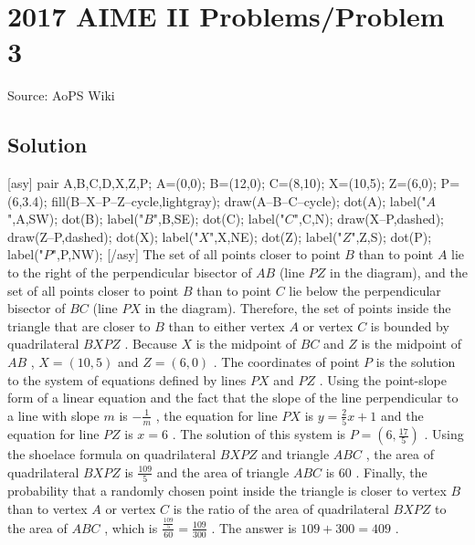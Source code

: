 \documentclass[12pt]{article}
\begin{document}
\section*{{2017 AIME II Problems/Problem 3}}
Source: AoPS Wiki

\subsection*{Solution}
[asy] pair A,B,C,D,X,Z,P; A=(0,0); B=(12,0); C=(8,10); X=(10,5); Z=(6,0); P=(6,3.4); fill(B--X--P--Z--cycle,lightgray); draw(A--B--C--cycle); dot(A); label("$A$",A,SW); dot(B); label("$B$",B,SE); dot(C); label("$C$",C,N); draw(X--P,dashed); draw(Z--P,dashed); dot(X); label("$X$",X,NE); dot(Z); label("$Z$",Z,S); dot(P); label("$P$",P,NW); [/asy] The set of all points closer to point $B$ than to point $A$ lie to the right of the perpendicular bisector of $AB$ (line $PZ$ in the diagram), and the set of all points closer to point $B$ than to point $C$ lie below the perpendicular bisector of $BC$ (line $PX$ in the diagram). Therefore, the set of points inside the triangle that are closer to $B$ than to either vertex $A$ or vertex $C$ is bounded by quadrilateral $BXPZ$ . Because $X$ is the midpoint of $BC$ and $Z$ is the midpoint of $AB$ , $X=(10,5)$ and $Z=(6,0)$ . The coordinates of point $P$ is the solution to the system of equations defined by lines $PX$ and $PZ$ . Using the point-slope form of a linear equation and the fact that the slope of the line perpendicular to a line with slope $m$ is $-\frac{1}{m}$ , the equation for line $PX$ is $y=\frac{2}{5}x+1$ and the equation for line $PZ$ is $x=6$ . The solution of this system is $P=\left(6,\frac{17}{5}\right)$ . Using the shoelace formula on quadrilateral $BXPZ$ and triangle $ABC$ , the area of quadrilateral $BXPZ$ is $\frac{109}{5}$ and the area of triangle $ABC$ is $60$ . Finally, the probability that a randomly chosen point inside the triangle is closer to vertex $B$ than to vertex $A$ or vertex $C$ is the ratio of the area of quadrilateral $BXPZ$ to the area of $ABC$ , which is $\frac{\frac{109}{5}}{60}=\frac{109}{300}$ . The answer is $109+300=\boxed{409}$ .
\end{document}
